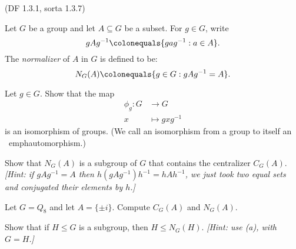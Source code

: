\begin{problem}{\textsf{(DF 1.3.1, sorta 1.3.7)}}
  
  \noindent
  Let $G$ be a group and let $A \subseteq G$ be a subset.
  For $g \in G$, write \[ gAg^{-1} \colonequals \{gag^{-1} : a \in A\}. \]
  The \emph{normalizer} of $A$ in $G$ is defined to be:
  \[ N_G(A) \colonequals \{g \in G : gAg^{-1}= A\}. \]
  \begin{enumalph}
  \item Let $g \in G$.  Show that the map 
  \begin{align*}
  \phi_g \colon G &\to G \\
  x &\mapsto gxg^{-1}
  \end{align*} 
  is an isomorphism of groups.  (We call an isomorphism from a group to itself an \
  emph{automorphism}.)
  \item Show that $N_G(A)$ is a subgroup of $G$ that contains the centralizer $C_G(A)
  $.  \emph{[Hint: if $gAg^{-1}=A$ then $h(gAg^{-1})h^{-1} = hAh^{-1}$, we just took 
  two equal sets and conjugated their elements by $h$.]}
  \item Let $G=Q_8$ and let $A=\{\pm i\}$.  Compute $C_G(A)$ and $N_G(A)$.  
  \item Show that if $H \leq G$ is a subgroup, then $H \leq N_G(H)$.  \emph{[Hint: 
  use (a), with $G=H$.]}  
  \end{enumalph}
\end{problem}
